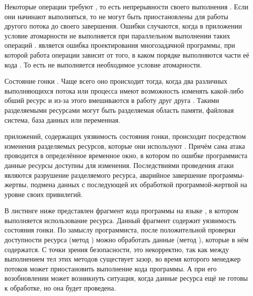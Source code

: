 

%
Некоторые операции требуют , то есть непрерывности своего выполнения . 
%
Если они начинают выполняться, то не могут быть приостановлены для работы другого потока до своего завершения. 
%
Ошибки случаются, когда в приложении условие атомарности не выполняется при параллельном выполнении таких операций . 
%
 является ошибка проектирования многозадачной программы, при которой работа операции зависит от того, в каком порядке выполняются части её кода . 
%
То есть не выполняется необходимое условие атомарности.

%
Состояние гонки . 
%
Чаще всего оно происходит тогда, когда два различных выполняющихся потока или процесса имеют возможность изменять какой-либо обший ресурс и из-за этого вмешиваются в работу друг друга  . 
%
Такими разделяемыми ресурсами могут быть разделяемая область памяти, файловая система, база данных или переменная. 

%
 приложений, содержащих уязвимость состояния гонки, происходит посредством изменения разделяемых ресурсов, которые они используют . 
%
Причём сама атака проводится в определённое временное окно, в котором по ошибке программиста данные ресурсы доступны для изменения. 
%
Последствиями проведения атаки являются разрушение разделяемого ресурса, аварийное завершение программы-жертвы, подмена данных с последующей их обработкой программой-жертвой на уровне своих привилегий. 

%
В листинге ниже представлен фрагмент кода программы на языке , в котором выполняется использование ресурса. 
%
Данный фрагмент содержит уязвимость состояния гонки. 
%
По замыслу программиста, после положительной проверки доступности ресурса (метод ) можно обработать данные (метод ), которые в нём содержатся. 
% 
С точки зрения безопасности, это некорректно, так как между выполнением тел этих методов существует зазор, во время которого менеджер потоков может приостановить выполнение кода программы. 
%
А при его возобновлении может возникнуть ситуация, когда данные ресурса ещё не готовы к обработке, но она будет проведена. 

